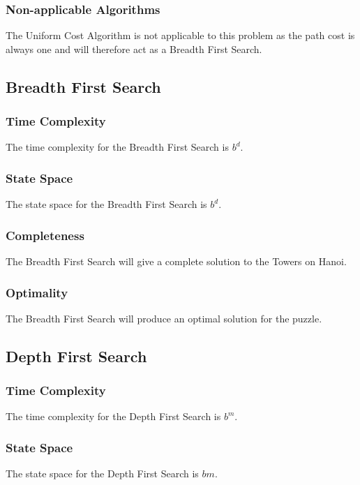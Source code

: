 \documentclass[10pt,letterpaper]{article}
\begin{document}
      \subsubsection{Non-applicable Algorithms}
	The Uniform Cost Algorithm is not applicable to this problem as the path cost is always one and will therefore act as a Breadth First Search.
  
    \subsection{Breadth First Search}
      \subsubsection{Time Complexity}
	The time complexity for the Breadth First Search is \(b^d\).
    
      \subsubsection{State Space}
	The state space for the Breadth First Search is \(b^d\).
      
      \subsubsection{Completeness}
	The Breadth First Search will give a complete solution to the Towers on Hanoi.
	
      \subsubsection{Optimality}
	The Breadth First Search will produce an optimal solution for the puzzle.
    
    \subsection{Depth First Search}
      \subsubsection{Time Complexity}
	The time complexity for the Depth First Search is \(b^m\).
    
      \subsubsection{State Space}
	The state space for the Depth First Search is \(bm\).
      
\end{document}
